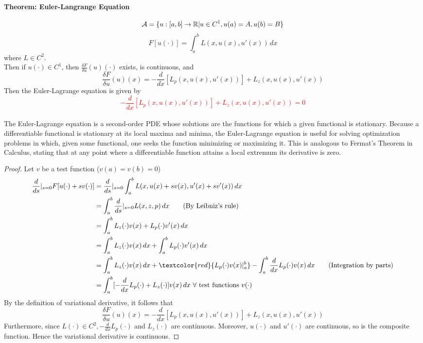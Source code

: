 \documentclass[11pt]{article}
\begin{document}
\paragraph{Theorem: Euler-Langrange Equation}
$$\mathcal{A} = \{ u: [a,b] \rightarrow \mathbb{R} | u \in C^1, u(a) = A, u(b) = B\}$$
$$F[u(\cdot)] = \int_a^b L(x,u(x),u'(x))\, dx$$
where $L \in C^2$. \\
Then if $u(\cdot) \in C^1$, then
$\frac{\delta F}{\delta u}(u)(\cdot)$ exists, is continuous, and
$$\frac{\delta F}{\delta u}(u)(x) = -\frac{d}{dx}[L_p(x,u(x),u'(x))] + L_z(x,u(x),u'(x))$$
Then the Euler-Lagrange equation is given by
\textcolor{red}{$$-\frac{d}{dx}[L_p(x,u(x),u'(x))] + L_z(x,u(x),u'(x)) = 0$$}\\
 The Euler-Lagrange equation is a second-order PDE whose solutions are the functions for which a given functional is stationary. Because a differentiable functional is stationary at its local maxima and minima, the Euler-Lagrange equation is useful for solving optimization problems in which, given some functional, one seeks the function minimizing or maximizing it. This is analogous to Fermat's Theorem in Calculus, stating that at any point where a differentiable function attains a local extremum its derivative is zero. \\
\begin{proof}
	Let $v$ be a test function ($v(a) = v(b) = 0$)
	\begin{align}
		\frac{d}{ds} |_{s=0} F[u(\cdot) + sv(\cdot)] 
		&= \frac{d}{ds}|_{s=0}\int_a^b L(x, u(x) + sv(x), u'(x) + sv'(x)) \, dx \\
		&= \int_a^b \frac{d}{ds}|_{s=0} L(x,z,p)\, dx \tag{By Leibniz's rule}\\
		&= \int_a^b L_z(\cdot)v(x) + L_p(\cdot)v'(x)\, dx \\
		&= \int_a^b L_z(\cdot)v(x) \, dx + \int_a^b L_p(\cdot)v'(x)\, dx \\
		&= \int_a^b L_z(\cdot)v(x) \, dx + \textcolor{red}{L_p(\cdot)v(x)|_a^b} - \int_a^b \frac{d}{dx}L_p(\cdot)v(x) \, dx \tag{Integration by parts} \\
		&= \int_a^b [-\frac{d}{dx}L_p(\cdot) + L_z(\cdot)]v(x) \, dx \text{  $\forall$ test functions $v(\cdot)$} 
	\end{align}
	By the definition of variational derivative, it follows that 
	$$\frac{\delta F}{\delta u}(u)(x) = -\frac{d}{dx}[L_p(x,u(x),u'(x))] + L_z(x,u(x),u'(x))$$
	Furthermore, since $L(\cdot) \in C^2, -\frac{d}{dx}L_p(\cdot)$ and $L_z(\cdot)$ are  continuous. Moreover, $u(\cdot)$ and $u'(\cdot)$ are continuous, so is the composite function. Hence the variational derivative is continuous. 
\end{proof}
\end{document}
